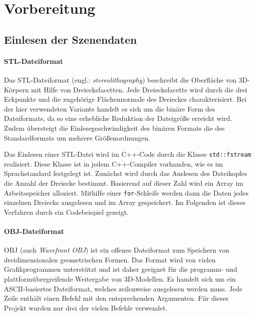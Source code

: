 \documentclass[crop=false]{standalone}
\begin{document}
  \section{Vorbereitung} %
  \label{sub:Vorbereitung}

    \subsection{Einlesen der Szenendaten} %
    \label{ssub:einlesen_der_daten}
      \paragraph{STL-Dateiformat}
      Das STL-Dateiformat (engl.: \textit{stereolithography}) beschreibt die Oberfläche von 3D-Körpern mit Hilfe von Dreiecksfacetten.
      Jede Dreiecksfacette wird durch die drei Eckpunkte und die zugehörige Flächennormale des Dreieckes charakterisiert.
      Bei der hier verwendeten Variante handelt es sich um die binäre Form des Dateiformats, da so eine erhebliche Reduktion der Dateigröße erreicht wird.
      Zudem übersteigt die Einlesegeschwindigkeit des binären Formats die des Standardformats um mehrere Größenordnungen.

      Das Einlesen einer STL-Datei wird im C++-Code durch die Klasse \texttt{std::fstream} realisiert.
      Diese Klasse ist in jedem C++-Compiler vorhanden, wie es im Sprachstandard festgelegt ist.
      Zunächst wird durch das Auslesen des Dateikopfes die Anzahl der Dreiecke bestimmt.
      Basierend auf dieser Zahl wird ein Array im Arbeitsspeicher alloziert.
      Mithilfe einer \texttt{for}-Schleife werden dann die Daten jedes einzelnen Dreiecks ausgelesen und im Array gespeichert.
      Im Folgenden ist dieses Verfahren durch ein Codebeispiel gezeigt.


      \paragraph{OBJ-Dateiformat}
      OBJ (auch \textit{Wavefront OBJ}) ist ein offenes Dateiformat zum Speichern von dreidimensionalen geometrischen Formen.
      Das Format wird von vielen Grafikprogrammen unterstützt und ist daher geeignet für die programm- und plattformübergreifende Weitergabe von 3D-Modellen.
      Es handelt sich um ein ASCII-basiertes Dateiformat, welches zeilenweise ausgelesen werden muss.
      Jede Zeile enthält einen Befehl mit den entsprechenden Argumenten.
      Für dieses Projekt wurden nur drei der vielen Befehle verwendet.
\end{document}
